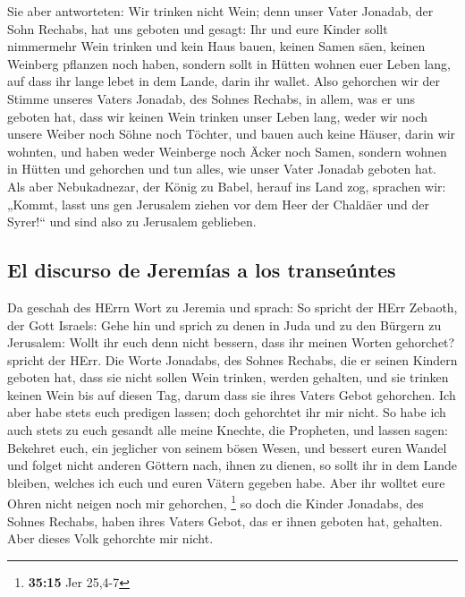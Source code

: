  Sie aber antworteten: Wir trinken nicht Wein; denn unser
Vater Jonadab, der Sohn Rechabs, hat uns geboten und gesagt: Ihr und
eure Kinder sollt nimmermehr Wein trinken  und kein Haus
bauen, keinen Samen säen, keinen Weinberg pflanzen noch haben, sondern
sollt in Hütten wohnen euer Leben lang, auf dass ihr lange lebet in dem
Lande, darin ihr wallet.  Also gehorchen wir der Stimme
unseres Vaters Jonadab, des Sohnes Rechabs, in allem, was er uns geboten
hat, dass wir keinen Wein trinken unser Leben lang, weder wir noch
unsere Weiber noch Söhne noch Töchter,  und bauen auch
keine Häuser, darin wir wohnten, und haben weder Weinberge noch Äcker
noch Samen,  sondern wohnen in Hütten und gehorchen und
tun alles, wie unser Vater Jonadab geboten hat.  Als aber
Nebukadnezar, der König zu Babel, herauf ins Land zog, sprachen wir:
„Kommt, lasst uns gen Jerusalem ziehen vor dem Heer der Chaldäer und der
Syrer!{}`` und sind also zu Jerusalem geblieben.

\hypertarget{el-discurso-de-jeremuxedas-a-los-transeuxfantes}{%
\subsection{El discurso de Jeremías a los
transeúntes}\label{el-discurso-de-jeremuxedas-a-los-transeuxfantes}}

 Da geschah des HErrn Wort zu Jeremia und sprach:
 So spricht der HErr Zebaoth, der Gott Israels: Gehe hin
und sprich zu denen in Juda und zu den Bürgern zu Jerusalem: Wollt ihr
euch denn nicht bessern, dass ihr meinen Worten gehorchet? spricht der
HErr.  Die Worte Jonadabs, des Sohnes Rechabs, die er
seinen Kindern geboten hat, dass sie nicht sollen Wein trinken, werden
gehalten, und sie trinken keinen Wein bis auf diesen Tag, darum dass sie
ihres Vaters Gebot gehorchen. Ich aber habe stets euch predigen lassen;
doch gehorchtet ihr mir nicht.  So habe ich auch stets zu
euch gesandt alle meine Knechte, die Propheten, und lassen sagen:
Bekehret euch, ein jeglicher von seinem bösen Wesen, und bessert euren
Wandel und folget nicht anderen Göttern nach, ihnen zu dienen, so sollt
ihr in dem Lande bleiben, welches ich euch und euren Vätern gegeben
habe. Aber ihr wolltet eure Ohren nicht neigen noch mir gehorchen,
\footnote{\textbf{35:15} Jer 25,4-7}  so doch die Kinder
Jonadabs, des Sohnes Rechabs, haben ihres Vaters Gebot, das er ihnen
geboten hat, gehalten. Aber dieses Volk gehorchte mir nicht.


